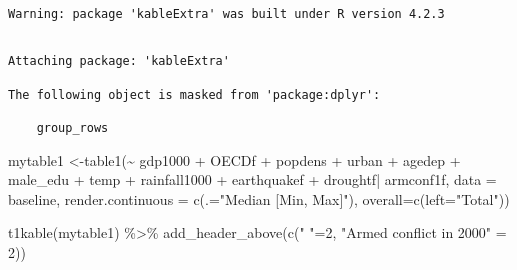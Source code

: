 \documentclass[
  letterpaper,
  DIV=11,
  numbers=noendperiod]{scrartcl}
\newenvironment{Shaded}{\begin{snugshade}}{\end{snugshade}}
\newcommand{\AttributeTok}[1]{\textcolor[rgb]{0.40,0.45,0.13}{#1}}
\newcommand{\DecValTok}[1]{\textcolor[rgb]{0.68,0.00,0.00}{#1}}
\newcommand{\DocumentationTok}[1]{\textcolor[rgb]{0.37,0.37,0.37}{\textit{#1}}}
\newcommand{\FunctionTok}[1]{\textcolor[rgb]{0.28,0.35,0.67}{#1}}
\newcommand{\NormalTok}[1]{\textcolor[rgb]{0.00,0.23,0.31}{#1}}
\newcommand{\OtherTok}[1]{\textcolor[rgb]{0.00,0.23,0.31}{#1}}
\newcommand{\SpecialCharTok}[1]{\textcolor[rgb]{0.37,0.37,0.37}{#1}}
\newcommand{\StringTok}[1]{\textcolor[rgb]{0.13,0.47,0.30}{#1}}
\begin{document}
\begin{Shaded}
\end{Shaded}

\begin{verbatim}
Warning: package 'kableExtra' was built under R version 4.2.3
\end{verbatim}

\begin{verbatim}

Attaching package: 'kableExtra'

The following object is masked from 'package:dplyr':

    group_rows
\end{verbatim}

\begin{Shaded}
\begin{Highlighting}[]
\NormalTok{mytable1 }\OtherTok{\textless{}{-}}\FunctionTok{table1}\NormalTok{(}\SpecialCharTok{\textasciitilde{}}\NormalTok{ gdp1000 }\SpecialCharTok{+}\NormalTok{ OECDf }\SpecialCharTok{+}\NormalTok{ popdens }\SpecialCharTok{+}\NormalTok{ urban }\SpecialCharTok{+}\NormalTok{ agedep }\SpecialCharTok{+}\NormalTok{ male\_edu }\SpecialCharTok{+}\NormalTok{ temp }\SpecialCharTok{+}\NormalTok{ rainfall1000 }\SpecialCharTok{+}\NormalTok{ earthquakef }\SpecialCharTok{+}\NormalTok{ droughtf}\SpecialCharTok{|}\NormalTok{ armconf1f, }\AttributeTok{data =}\NormalTok{ baseline, }\AttributeTok{render.continuous =} \FunctionTok{c}\NormalTok{(}\AttributeTok{.=}\StringTok{"Median [Min, Max]"}\NormalTok{), }\AttributeTok{overall=}\FunctionTok{c}\NormalTok{(}\AttributeTok{left=}\StringTok{"Total"}\NormalTok{))}

\FunctionTok{t1kable}\NormalTok{(mytable1) }\SpecialCharTok{\%\textgreater{}\%}
  \FunctionTok{add\_header\_above}\NormalTok{(}\FunctionTok{c}\NormalTok{(}\StringTok{" "}\OtherTok{=}\DecValTok{2}\NormalTok{, }\StringTok{"Armed conflict in 2000"} \OtherTok{=} \DecValTok{2}\NormalTok{))}
\end{Highlighting}
\end{Shaded}
\end{document}
